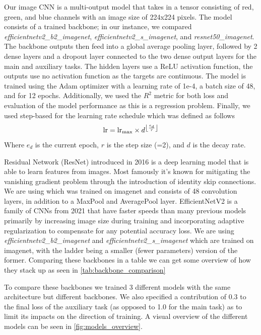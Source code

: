 \documentclass[12pt,a4paper,oneside]{article}
\begin{document}
Our image CNN is a multi-output model that takes in a tensor consisting of red, green, and blue channels with an image size of 224x224 pixels. The model consists of a trained backbone; in our instance, we compared \textit{efficientnetv2\_b2\_imagenet}, \textit{efficientnetv2\_s\_imagenet}, and \textit{resnet50\_imagenet}. The backbone outputs then feed into a global average pooling layer, followed by 2 dense layers and a dropout layer connected to the two dense output layers for the main and auxiliary tasks. The hidden layers use a ReLU activation function, the outputs use no activation function as the targets are continuous. The model is trained using the Adam optimizer with a learning rate of 1e-4, a batch size of 48, and for 12 epochs. Additionally, we used the $R^2$ metric for both loss and evaluation of the model performance as this is a regression problem. Finally, we used step-based for the learning rate schedule which was defined as follows
\[
    \text{lr} = \text{lr}_\text{max} \times d^{\floor*{\frac{e_d}{r}}}
\]
Where $e_d$ is the current epoch, $r$ is the step size (=2), and $d$ is the decay rate.

\smallskip
Residual Network (ResNet) \cite{he2016identity} introduced in 2016 is a deep learning model that is able to learn features from images. Most famously it's known for mitigating the vanishing gradient problem through the introduction of identity skip connections. We are using  which was trained on imagenet and consists of 48 convolution layers, in addition to a MaxPool and AveragePool layer. EfficientNetV2 \cite{tan2021efficientnetv2} is a family of CNNs from 2021 that have faster speeds than many previous models primarily by increasing image size during training and incorporating adaptive regularization to compensate for any potential accuracy loss. We are using \textit{efficientnetv2\_b2\_imagenet} and \textit{efficientnetv2\_s\_imagenet} which are trained on imagenet, with the ladder being a smaller (fewer parameters) version of the former. Comparing these backbones in a table we can get some overview of how they stack up as seen in \ref{tab:backbone_comparison}

To compare these backbones we trained 3 different models with the same architecture but different backbones. We also specified a contribution of 0.3 to the final loss of the auxiliary task (as opposed to 1.0 for the main task) as to limit its impacts on the direction of training. A visual overview of the different models can be seen in \ref{fig:models_overview}. 
\end{document}
